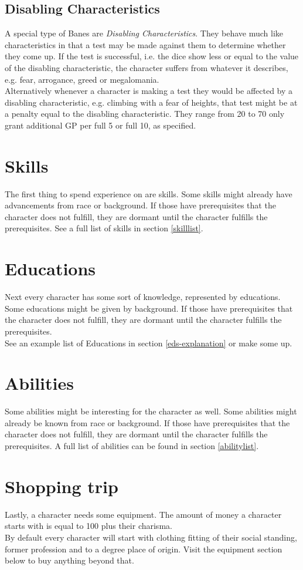 \documentclass[12pt,a4paper,openany,usenames,dvipsnames]{book}
\begin{document}
	\subsection{Disabling Characteristics}
	A special type of Banes are \emph{Disabling Characteristics}. They behave much like characteristics in that a test may be made against them to determine whether they come up. If the test is successful, i.e. the dice show less or equal to the value of the disabling characteristic, the character suffers from whatever it describes, e.g. fear, arrogance, greed or megalomania.\\
	Alternatively whenever a character is making a test they would be affected by a disabling characteristic, e.g. climbing with a fear of heights, that test might be at a penalty equal to the disabling characteristic. They range from 20 to 70 only grant additional GP per full 5 or full 10, as specified.
	
	\section{Skills}
	The first thing to spend experience on are skills. Some skills might already have advancements from race or background. If those have prerequisites that the character does not fulfill, they are dormant until the character fulfills the prerequisites. See a full list of skills in section \ref{skilllist}.
	\section{Educations}
	Next every character has some sort of knowledge, represented by educations. Some educations might be given by background. If those have prerequisites that the character does not fulfill, they are dormant until the character fulfills the prerequisites.\\
	See an example list of Educations in section \ref{eds-explanation} or make some up.
	\section{Abilities}
	Some abilities might be interesting for the character as well. Some abilities might already be known from race or background. If those have prerequisites that the character does not fulfill, they are dormant until the character fulfills the prerequisites. A full list of abilities can be found in section \ref{abilitylist}.
	\section{Shopping trip}
	Lastly, a character needs some equipment. The amount of money a character starts with is equal to 100 plus their charisma. \\
	By default every character will start with clothing fitting of their social standing, former profession and to a degree place of origin. Visit the equipment section below to buy anything beyond that.
\end{document}
